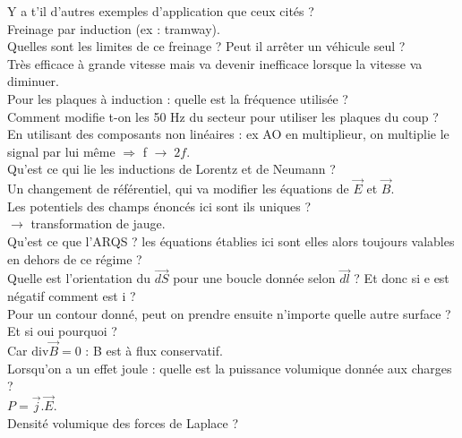 \documentclass[12pt,prb,aps,epsf]{article}
\begin{document}
Y a t'il d'autres exemples d'application que ceux cités ?\\
Freinage par induction (ex : tramway).\\

Quelles sont les limites de ce freinage ? Peut il arrêter un véhicule seul ?\\
Très efficace à grande vitesse mais va devenir inefficace lorsque la vitesse va diminuer.\\

Pour les plaques à induction : quelle est la fréquence utilisée ?\\
Comment modifie t-on les 50 Hz du secteur pour utiliser les plaques du coup ?\\
En utilisant des composants non linéaires : ex AO en multiplieur, on multiplie le signal par lui même $\Rightarrow$ f $\rightarrow\;2f$.\\


Qu'est ce qui lie les inductions de Lorentz et de Neumann ?\\
Un changement de référentiel, qui va modifier les équations de $\vec{E}$ et $\vec{B}$.\\

Les potentiels des champs énoncés ici sont ils uniques ?\\
$\rightarrow$ transformation de jauge.\\

Qu'est ce que l'ARQS ? les équations établies ici sont elles alors toujours valables en dehors de ce régime ? \\

Quelle est l'orientation du $\vec{dS}$ pour une boucle donnée selon $\vec{dl}$ ? Et donc si e est négatif comment est i ?\\

Pour un contour donné, peut on prendre ensuite n'importe quelle autre surface ? Et si oui pourquoi ?\\
Car $\mathrm{div}\vec{B} = 0$ : B est à flux conservatif.\\

Lorsqu'on a un effet joule : quelle est la puissance volumique donnée aux charges ?\\
$P = \vec{j}.\vec{E}$.\\

Densité volumique des forces de Laplace ?
\end{document}
